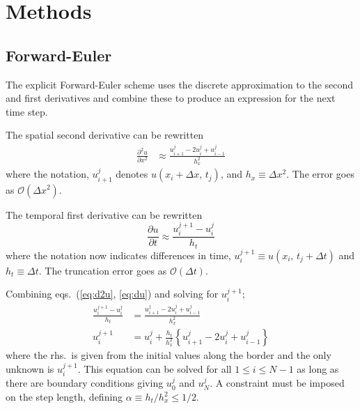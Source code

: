 \documentclass[a4paper,11pt]{article}
\begin{document}
\section{Methods}
\subsection{Forward-Euler}
The explicit Forward-Euler scheme uses the discrete approximation to the second and first derivatives and combine these to produce an expression for the next time step.

The spatial second derivative can be rewritten
\begin{align}
    \frac{\partial^2 u}{\partial x^2} &\approx \frac{u^j_{i+1} - 2 u^j_{i} + u^j_{i-1}}{h_x^2}
    \label{eq:d2u}
\end{align}
where the notation, $u^j_{i+1}$ denotes $u(x_i + \Delta x, \, t_j)$, and $h_x \equiv \Delta x^2$. The error goes as $\mathcal{O}(\Delta x^2)$.

The temporal first derivative can be rewritten 
\begin{equation}
    \frac{\partial u}{\partial t} \approx \frac{u^{j+1}_i - u^{j}_i}{h_t}
    \label{eq:du}
\end{equation}
where the notation now indicates differences in time, $u^{j+1}_i \equiv u\left( x_i, \, t_j + \Delta t \right)$ and $h_t \equiv \Delta t$. The truncation error goes as $\mathcal{O}(\Delta t)$.

Combining eqs.~(\ref{eq:d2u}, \ref{eq:du}) and solving for $u^{j+1}_i$;
\begin{align*}
    \frac{u^{j+1}_i - u^{j}_i}{h_t} &= \frac{u^j_{i+1} - 2 u^j_{i} + u^j_{i-1}}{h_x^2} \\
    u^{j+1}_i &= u^j_i + \frac{h_t}{h_x^2} \left\{  u^j_{i+1} - 2 u^j_{i} + u^j_{i-1} \right\} 
\end{align*}
where the rhs.~is given from the initial values along the border and the only unknown is $u^{j+1}_i$. This equation can be solved for all $ 1 \leq i \leq N-1$ as long as there are boundary conditions giving $u_0^j$ and $u_N^j$. A constraint must be imposed on the step length, defining $\alpha \equiv h_t/h_x^2 \leq 1/2$.
\end{document}
